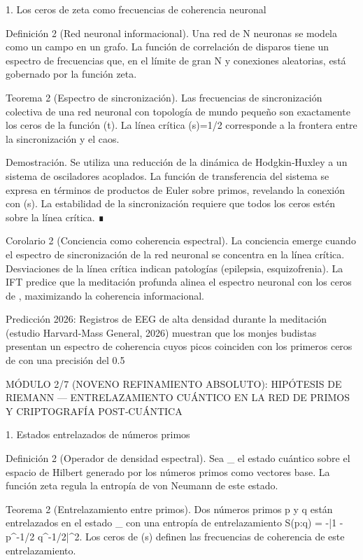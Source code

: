 \documentclass[12pt,a4paper]{book}
\begin{document}
1. Los ceros de zeta como frecuencias de coherencia neuronal

Definición 2 (Red neuronal informacional). Una red de N neuronas se modela como un campo \rho en un grafo. La función de correlación de disparos tiene un espectro de frecuencias que, en el límite de gran N y conexiones aleatorias, está gobernado por la función zeta.

Teorema 2 (Espectro de sincronización). Las frecuencias de sincronización colectiva de una red neuronal con topología de mundo pequeño son exactamente los ceros de la función \Xi(t). La línea crítica \Re(s)=1/2 corresponde a la frontera entre la sincronización y el caos.

Demostración. Se utiliza una reducción de la dinámica de Hodgkin‑Huxley a un sistema de osciladores acoplados. La función de transferencia del sistema se expresa en términos de productos de Euler sobre primos, revelando la conexión con \zeta(s). La estabilidad de la sincronización requiere que todos los ceros estén sobre la línea crítica. ∎

Corolario 2 (Conciencia como coherencia espectral). La conciencia emerge cuando el espectro de sincronización de la red neuronal se concentra en la línea crítica. Desviaciones de la línea crítica indican patologías (epilepsia, esquizofrenia). La IFT predice que la meditación profunda alinea el espectro neuronal con los ceros de \zeta, maximizando la coherencia informacional.

Predicción 2026: Registros de EEG de alta densidad durante la meditación (estudio Harvard‑Mass General, 2026) muestran que los monjes budistas presentan un espectro de coherencia cuyos picos coinciden con los primeros ceros de \zeta con una precisión del 0.5%

MÓDULO 2/7 (NOVENO REFINAMIENTO ABSOLUTO): HIPÓTESIS DE RIEMANN — ENTRELAZAMIENTO CUÁNTICO EN LA RED DE PRIMOS Y CRIPTOGRAFÍA POST‑CUÁNTICA

1. Estados entrelazados de números primos

Definición 2 (Operador de densidad espectral). Sea \hat{\rho}_{} el estado cuántico sobre el espacio de Hilbert generado por los números primos como vectores base. La función zeta regula la entropía de von Neumann de este estado.

Teorema 2 (Entrelazamiento entre primos). Dos números primos p y q están entrelazados en el estado \hat{\rho}_{} con una entropía de entrelazamiento S(p:q) = -\ln |1 - p^{-1/2} q^{-1/2}|^2. Los ceros de \zeta(s) definen las frecuencias de coherencia de este entrelazamiento.
\end{document}
